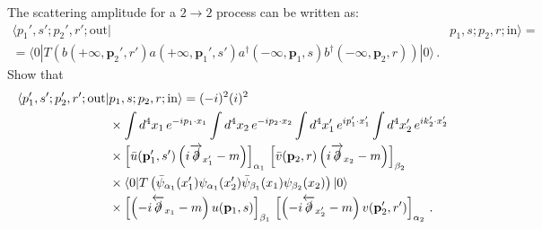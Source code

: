 \documentclass{tutorial}
\begin{document}
    The scattering amplitude for a $2\longrightarrow 2$ process can be
    written as: 
    \begin{align}
      \label{eq:4}
      \langle p_1', s'; p_2', r';\mathrm{out} | 
      &p_1, s; p_2, r; \mathrm{in} \rangle 
      = \nonumber \\
      = \langle 0 | T\left(
        b(+\infty,\mathbf{p}_2',r') a(+\infty,\mathbf{p}_1',s') 
        a^\dagger(-\infty,\mathbf{p}_1,s) b^\dagger(-\infty,\mathbf{p}_2,r)
        \right) |0 \rangle\, .
    \end{align}
    Show that
    \begin{align}
      \label{eq:5}
      \langle p_1', s'; p_2', r';\mathrm{out} |
      & p_1, s; p_2, r; \mathrm{in} \rangle = (-i)^{2} (i)^{2} \nonumber \\
      & \times \int d^4x_1\, e^{-i p_1\cdot x_1}  
        \int d^4x_2\, e^{-i p_2\cdot x_2}
        \int d^4x_1'\, e^{i p_1'\cdot x_1'} 
        \int d^4x_2'\, e^{i k_2'\cdot x_2'} \nonumber \\
      & \times \left[\bar{u}(\mathbf{p}_1',s') 
         \left(i\overrightarrow{\slashed{\partial}}_{x_1'} -
         m\right)\right]_{\alpha_1}\,  
         \left[\bar{v}(\mathbf{p}_2,r) 
         \left(i\overrightarrow{\slashed{\partial}}_{x_2} -
         m\right)\right]_{\beta_2}   \nonumber \\
      & \times \langle 0 | T\left(
        \bar\psi_{\alpha_1}(x_1') \psi_{\alpha_1}(x_2') \bar{\psi}_{\beta_1}(x_1) \psi_{\beta_2}(x_2)
        \right) |0 \rangle \nonumber \\
      & \times \left[\left(-i\overleftarrow{\slashed{\partial}}_{x_1} -
        m\right) u(\mathbf{p}_1,s)\right]_{\beta_1}\,  
        \left[\left(-i\overleftarrow{\slashed{\partial}}_{x_2'} -
        m\right) v(\mathbf{p}_2',r')\right]_{\alpha_2}\, .        
    \end{align}
\end{document}
